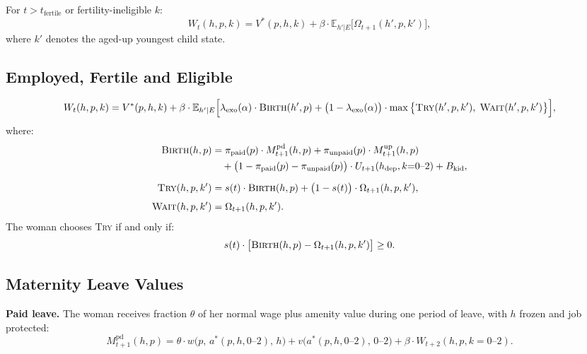 \documentclass[11pt]{article}
\newcommand{\E}{\mathbb{E}}
\begin{document}
For $t > t_{\text{fertile}}$ or fertility-ineligible $k$:
\begin{equation}\label{eq:W_nonfertile}
  W_t(h, p, k) = V^*(p, h, k) + \beta \cdot \E_{h'|E}\big[\Omega_{t+1}(h', p, k')\big],
\end{equation}
where $k'$ denotes the aged-up youngest child state.

\subsection{Employed, Fertile and Eligible}

\begin{equation}\label{eq:W_fertile}
  W_t(h, p, k) = V^*(p, h, k) + \beta \cdot \E_{h'|E}\Big[
    \lambda_{\text{exo}}(\alpha) \cdot \textsc{Birth}(h', p)
    + \big(1 - \lambda_{\text{exo}}(\alpha)\big) \cdot \max\big\{\textsc{Try}(h', p, k'),\; \textsc{Wait}(h', p, k')\big\}
  \Big],
\end{equation}
where:
\begin{align}
  \textsc{Birth}(h, p) &= \pi_{\text{paid}}(p) \cdot M^{\text{pd}}_{t+1}(h, p) + \pi_{\text{unpaid}}(p) \cdot M^{\text{up}}_{t+1}(h, p) \notag\\
  &\quad + \big(1 - \pi_{\text{paid}}(p) - \pi_{\text{unpaid}}(p)\big) \cdot U_{t+1}(h_{\text{dep}}, k{=}0\text{--}2) + B_{\text{kid}}, \label{eq:BIRTH}\\[6pt]
  \textsc{Try}(h, p, k') &= s(t) \cdot \textsc{Birth}(h, p) + \big(1 - s(t)\big) \cdot \Omega_{t+1}(h, p, k'), \label{eq:TRY}\\[4pt]
  \textsc{Wait}(h, p, k') &= \Omega_{t+1}(h, p, k'). \label{eq:WAIT}
\end{align}
The woman chooses \textsc{Try} if and only if:
\begin{equation}\label{eq:try_condition}
  s(t) \cdot \big[\textsc{Birth}(h, p) - \Omega_{t+1}(h, p, k')\big] \geq 0.
\end{equation}

\subsection{Maternity Leave Values}

\textbf{Paid leave.} The woman receives fraction $\theta$ of her normal wage plus amenity value during one period of leave, with $h$ frozen and job protected:
\begin{equation}\label{eq:M_paid}
  M^{\text{pd}}_{t+1}(h, p) = \theta \cdot w\big(p,\, a^*(p, h, 0\text{--}2),\, h\big) + v\big(a^*(p, h, 0\text{--}2),\, 0\text{--}2\big) + \beta \cdot W_{t+2}(h, p, k{=}0\text{--}2).
\end{equation}
\end{document}
